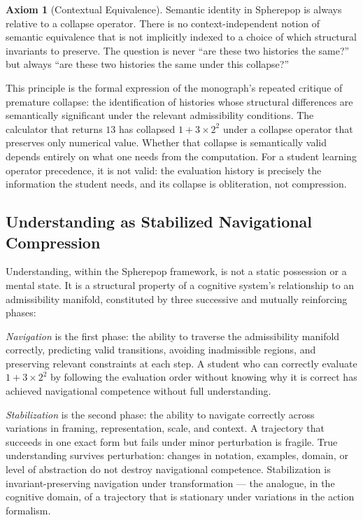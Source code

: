 \documentclass[12pt,openany]{book}
\theoremstyle{plain}
\theoremstyle{definition}
\newtheorem{axiom}[theorem]{Axiom}
\theoremstyle{remark}
\begin{document}
\begin{axiom}[Contextual Equivalence]
Semantic identity in Spherepop is always relative to a collapse operator. There is no context-independent notion of semantic equivalence that is not implicitly indexed to a choice of which structural invariants to preserve. The question is never \enquote{are these two histories the same?} but always \enquote{are these two histories the same under this collapse?}
\end{axiom}

This principle is the formal expression of the monograph's repeated critique of premature collapse: the identification of histories whose structural differences are semantically significant under the relevant admissibility conditions. The calculator that returns $13$ has collapsed $1 + 3 \times 2^2$ under a collapse operator that preserves only numerical value. Whether that collapse is semantically valid depends entirely on what one needs from the computation. For a student learning operator precedence, it is not valid: the evaluation history is precisely the information the student needs, and its collapse is obliteration, not compression.

\subsection*{Understanding as Stabilized Navigational Compression}

Understanding, within the Spherepop framework, is not a static possession or a mental state. It is a structural property of a cognitive system's relationship to an admissibility manifold, constituted by three successive and mutually reinforcing phases:

\emph{Navigation} is the first phase: the ability to traverse the admissibility manifold correctly, predicting valid transitions, avoiding inadmissible regions, and preserving relevant constraints at each step. A student who can correctly evaluate $1 + 3 \times 2^2$ by following the evaluation order without knowing why it is correct has achieved navigational competence without full understanding.

\emph{Stabilization} is the second phase: the ability to navigate correctly across variations in framing, representation, scale, and context. A trajectory that succeeds in one exact form but fails under minor perturbation is fragile. True understanding survives perturbation: changes in notation, examples, domain, or level of abstraction do not destroy navigational competence. Stabilization is invariant-preserving navigation under transformation — the analogue, in the cognitive domain, of a trajectory that is stationary under variations in the action formalism.
\end{document}

